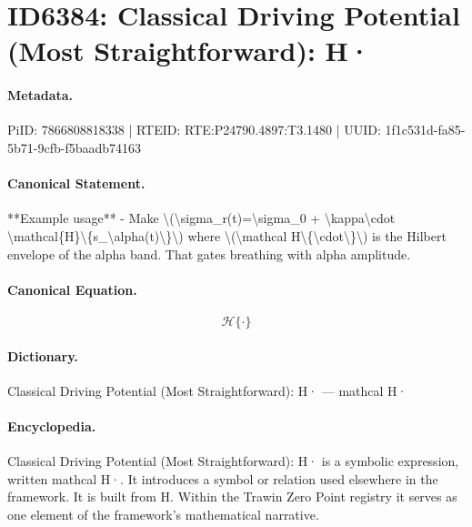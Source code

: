 \section*{ID6384: Classical Driving Potential (Most Straightforward): H·}
\paragraph{Metadata.}
PiID: 7866808818338 | RTEID: RTE:P24790.4897:T3.1480 | UUID: 1f1c531d-fa85-5b71-9cfb-f5baadb74163

\paragraph{Canonical Statement.}
**Example usage** - Make \textbackslash{}(\textbackslash{}sigma\_r(t)=\textbackslash{}sigma\_0 + \textbackslash{}kappa\textbackslash{}cdot \textbackslash{}mathcal\{H\}\textbackslash{}\{s\_\textbackslash{}alpha(t)\textbackslash{}\}\textbackslash{}) where \textbackslash{}(\textbackslash{}mathcal H\textbackslash{}\{\textbackslash{}cdot\textbackslash{}\}\textbackslash{}) is the Hilbert envelope of the alpha band. That gates breathing with alpha amplitude.

\paragraph{Canonical Equation.}
\[
\mathcal H\{\cdot\}
\]

\paragraph{Dictionary.}
Classical Driving Potential (Most Straightforward): H· — mathcal H·

\paragraph{Encyclopedia.}
Classical Driving Potential (Most Straightforward): H· is a symbolic expression, written mathcal H·. It introduces a symbol or relation used elsewhere in the framework. It is built from H. Within the Trawin Zero Point registry it serves as one element of the framework's mathematical narrative.
